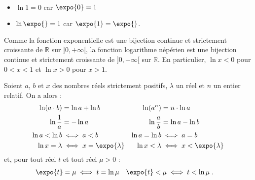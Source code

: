       \begin{rmk}~\\[-1\baselineskip]
            \begin{itemize}
                  \item $\ln 1 = 0$ car $\expo{0} = 1$
                  \item $\ln \expo{} = 1$ car $\expo{1} = \expo{}$.
            \end{itemize}
            Comme la fonction exponentielle est une bijection continue et strictement croissante de $\mathbb{R}$ sur $]0,+\infty[$, 
            la fonction logarithme n\'ep\'erien est une bijection continue et strictement croissante de $]0,+\infty[$ sur $\mathbb{R}$.
            En particulier, $\ln x < 0$ pour $0 < x < 1$ et $\ln x > 0$ pour $x > 1$.
      \end{rmk}
      \begin{prop}
            Soient $a$, $b$ et $x$ des nombres r\'eels strictement positifs, $\lambda$ un r\'eel et $n$ un entier relatif.
            On a alors :\\
            \begin{align*}
                        \ln (a\cdot b) & = \ln a + \ln b                                                &       
                        \ln (a^n) & = n \cdot \ln a                                                     \\
                        \ln \frac{1}{a} & = - \ln a                                                     & 
                        \ln \frac{a}{b} & = \ln a - \ln b                                               \\
                        \ln a < \ln b & \iff a < b                                                      & 
                        \ln a = \ln b & \iff a = b                                                      \\
                        \ln x = \lambda & \iff x = \expo{\lambda}      & 
                        \ln x < \lambda & \iff x < \expo{\lambda}      
            \end{align*}
            et, pour tout r\'eel $t$ et tout r\'eel $\mu > 0$ :
            \begin{align*}
                        \expo{t} = \mu & \iff t = \ln{\mu} &
                        \expo{t} < \mu & \iff t < \ln{\mu} \;.
            \end{align*}
      \end{prop}
